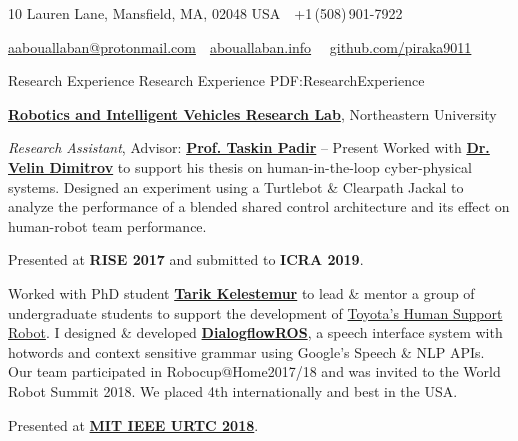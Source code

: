 \documentclass[letterpaper,MMMyyyy,nonstopmode]{simpleresumecv}
\newcommand{\CVAuthor}{Anas Abou Allaban}
\newcommand{\CVWebpage}{abouallaban.info}
\begin{document}

\Title{\CVAuthor}

\begin{SubTitle}
10 Lauren Lane, Mansfield, MA, 02048 USA
\,\SubBulletSymbol\,
+1\,(508)\,901-7922
\par
\href{mailto:aabouallaban@protonmail.com}
{aabouallaban@protonmail.com}
\,\SubBulletSymbol\,
\href{http://abouallaban.info}
{\url{\CVWebpage}}
\, \SubBulletSymbol\,
\href{http://github.com/piraka9011}
{\url{github.com/piraka9011}}
\end{SubTitle}

\begin{Body}



\Section
{Research Experience}
{Research Experience}
{PDF:ResearchExperience}

\Entry
\href{http://robot.neu.edu/}
{\textbf{Robotics and Intelligent Vehicles Research Lab}},
Northeastern University

\Gap
\textit{Research Assistant}, Advisor: 
\href{tpadir.info}{\textbf{Prof. Taskin Padir}}
\hfill
{} -- Present
\BulletItem 
Worked with \textbf{\href{https://www.linkedin.com/in/velin-dimitrov/}{Dr. Velin Dimitrov}} to support his thesis on human-in-the-loop cyber-physical systems. Designed an experiment using a Turtlebot \& Clearpath Jackal to analyze the performance of a blended shared control architecture and its effect on human-robot team performance.
\begin{Detail}
	\Item
	Presented at \textbf{RISE 2017} and submitted to \textbf{ICRA 2019}.
\end{Detail}
\BulletItem 
Worked with PhD student \href{http://kelestemur.com/}{\textbf{Tarik Kelestemur}} to lead \& mentor a group of undergraduate students to support the development of \href{http://www.toyota-global.com/innovation/partner_robot/family_2.html}{Toyota's Human Support Robot}. I designed \& developed \href{http://wiki.ros.org/dialogflow_ros}{\textbf{DialogflowROS}}, a speech interface system with hotwords and context sensitive grammar using Google's Speech \& NLP APIs. Our team participated in Robocup@Home2017/18 and was invited to the World Robot Summit 2018. We placed 4th internationally and best in the USA.
\begin{Detail}
	\Item
	Presented at \href{http://ieee.scripts.mit.edu/conference/}{\textbf{MIT IEEE URTC 2018}}.
\end{Detail}
\SectionSpace


\end{Body}
\end{document}
